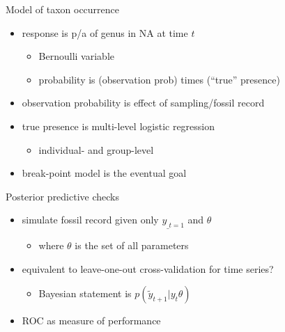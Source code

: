 \documentclass{beamer}
\begin{document}
\begin{frame}
  \begin{block}{Model of taxon occurrence}
    \begin{itemize}
      \item response is p/a of genus in NA at time \(t\)
        \begin{itemize}
          \item Bernoulli variable 
          \item probability is (observation prob) times (``true'' presence)
        \end{itemize}
      \item observation probability is effect of sampling/fossil record
      \item true presence is multi-level logistic regression
        \begin{itemize}
          \item individual- and group-level
        \end{itemize}
      \item break-point model is the eventual goal
    \end{itemize}
  \end{block}
\end{frame}

\begin{frame}
  \begin{block}{Posterior predictive checks}
    \begin{itemize}
      \item simulate fossil record given only \(y_{\_t = 1}\) and \(\theta\)
        \begin{itemize}
          \item where \(\theta\) is the set of all parameters
        \end{itemize}
      \item equivalent to leave-one-out cross-validation for time series?
        \begin{itemize}
          \item Bayesian statement is \(p(\tilde{y}_{t + 1} | y_{t} \theta)\)
        \end{itemize}
      \item ROC as measure of performance
    \end{itemize}
  \end{block}
\end{frame}
\end{document}
